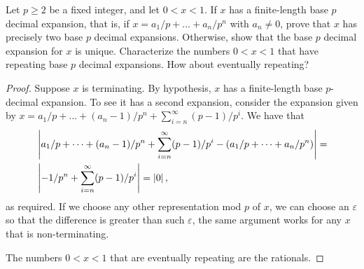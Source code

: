 \begin{exercise}{21}
Let $p\geq 2$ be a fixed integer, and let $0<x<1$. If $x$ has a finite-length base $p$ decimal expansion, that is, if $x=a_1/p+\dots+a_n/p^n$ with $a_n\neq 0$, prove that $x$ has precisely two base $p$ decimal expansions. Otherwise, show that the base $p$ decimal expansion for $x$ is unique. Characterize the numbers $0<x<1$ that have repeating base $p$ decimal expansions. How about eventually repeating?
\end{exercise}
\begin{proof}
Suppose $x$ is terminating. By hypothesis, $x$ has a finite-length base $p$-decimal expansion. To see it has a second expansion, consider the expansion given by $x=a_1/p+\dots+(a_n-1)/p^n+\sum_{i=n}^\infty (p-1)/p^i$. We have that 
\begin{align*}
    &\left\lvert a_1/p+\dots+(a_n-1)/p^n+\sum_{i=n}^\infty (p-1)/p^i - \left(a_1/p+\dots+a_n/p^n\right)\right\rvert =\\
    &\left\lvert -1/p^n+\sum_{i=n}^\infty (p-1)/p^i\right\rvert= \left\lvert 0\right\rvert,
\end{align*}
as required. If we choose any other representation mod $p$ of $x$, we can choose an $\varepsilon$ so that the difference is greater than such $\varepsilon$, the same argument works for any $x$ that is non-terminating.

The numbers $0<x<1$ that are eventually repeating are the rationals.
\end{proof}

